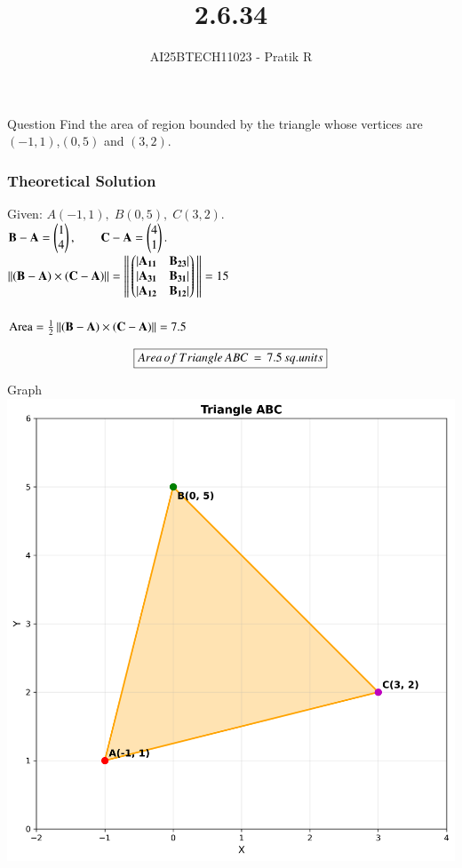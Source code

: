 \documentclass{beamer}
\title
{2.6.34}
\author 
{AI25BTECH11023 - Pratik R}
\begin{document}
\frame{\titlepage}
\begin{frame}{Question}
\centering
Find the area of region bounded by the triangle whose vertices are $(-1, 1)$,$(0, 5)$ and
$(3, 2)$.
\end{frame}


\begin{frame}[fragile]
    \frametitle{Theoretical Solution}
Given: $A(-1,1),\; B(0,5),\; C(3,2).$\\

$
\mathbf{B}-\mathbf{A} =\begin{pmatrix}1\\4\end{pmatrix},\qquad
\mathbf{C}-\mathbf{A} = \begin{pmatrix}4\\1\end{pmatrix}.
$\\

$\left\lVert\mathbf{(B-A)} \times \mathbf{(C-A)}\right\rVert = \left\lVert\,\begin{pmatrix}|\mathbf{A_{11}} & \mathbf{B_{23}}| \\ |\mathbf{A_{31}} & \mathbf{B_{31}}| \\ |\mathbf{A_{12}} & \mathbf{B_{12}}|\end{pmatrix}\,\right\rVert = 15 $\\\\


$
\text{Area}=\frac{1}{2}\left\lVert\mathbf{(B-A)} \times \mathbf{(C-A)}\right\rVert = 7.5
$

\begin{align}
    \centering
    \boxed{Area \, of \, Triangle \, ABC \,= \,7.5\,sq.units}
\end{align}
\end{frame}

\begin{frame}{Graph}
   \centering
    \includegraphics[width=\columnwidth, height=0.8\textheight, keepaspectratio]{figs/fig.png}
    \label{fig:Beamer/figs/fig.png}
\end{frame}
\end{document}
